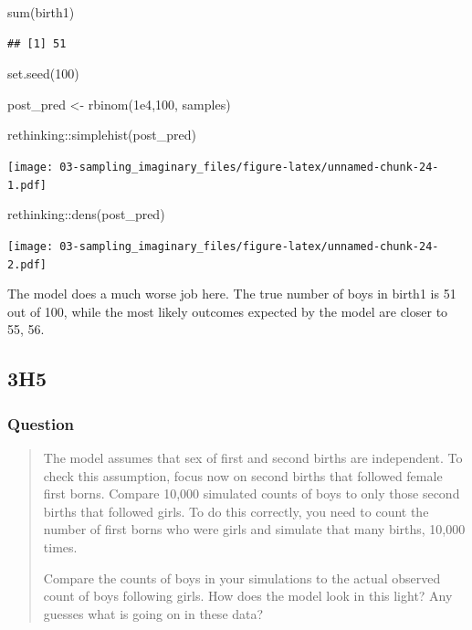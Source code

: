 \documentclass[
]{book}
\newenvironment{Shaded}{\begin{snugshade}}{\end{snugshade}}
\newcommand{\DecValTok}[1]{\textcolor[rgb]{0.00,0.00,0.81}{#1}}
\newcommand{\FloatTok}[1]{\textcolor[rgb]{0.00,0.00,0.81}{#1}}
\newcommand{\FunctionTok}[1]{\textcolor[rgb]{0.00,0.00,0.00}{#1}}
\newcommand{\NormalTok}[1]{#1}
\newcommand{\OtherTok}[1]{\textcolor[rgb]{0.56,0.35,0.01}{#1}}
\newcommand{\SpecialCharTok}[1]{\textcolor[rgb]{0.00,0.00,0.00}{#1}}
\begin{document}
\begin{Shaded}
\begin{Highlighting}[]
\FunctionTok{sum}\NormalTok{(birth1)}
\end{Highlighting}
\end{Shaded}

\begin{verbatim}
## [1] 51
\end{verbatim}

\begin{Shaded}
\begin{Highlighting}[]
\FunctionTok{set.seed}\NormalTok{(}\DecValTok{100}\NormalTok{)}

\NormalTok{post\_pred }\OtherTok{\textless{}{-}} \FunctionTok{rbinom}\NormalTok{(}\FloatTok{1e4}\NormalTok{,}\DecValTok{100}\NormalTok{, samples)}

\NormalTok{rethinking}\SpecialCharTok{::}\FunctionTok{simplehist}\NormalTok{(post\_pred)}
\end{Highlighting}
\end{Shaded}

\texttt{[image: 03-sampling\_imaginary\_files/figure-latex/unnamed-chunk-24-1.pdf]}

\begin{Shaded}
\begin{Highlighting}[]
\NormalTok{rethinking}\SpecialCharTok{::}\FunctionTok{dens}\NormalTok{(post\_pred)}
\end{Highlighting}
\end{Shaded}

\texttt{[image: 03-sampling\_imaginary\_files/figure-latex/unnamed-chunk-24-2.pdf]}

The model does a much worse job here. The true number of boys in birth1 is 51 out of 100, while the most likely outcomes expected by the model are closer to 55, 56.

\hypertarget{h5}{%
\subsection*{3H5}\label{h5}}

\hypertarget{question-32}{%
\subsubsection*{Question}\label{question-32}}

\begin{quote}
The model assumes that sex of first and second births are independent. To check this assumption, focus now on second births that followed female first borns. Compare 10,000 simulated counts of boys to only those second births that followed girls. To do this correctly, you need to count the number of first borns who were girls and simulate that many births, 10,000 times.

Compare the counts of boys in your simulations to the actual observed count of boys following girls. How does the model look in this light? Any guesses what is going on in these data?
\end{quote}
\end{document}
